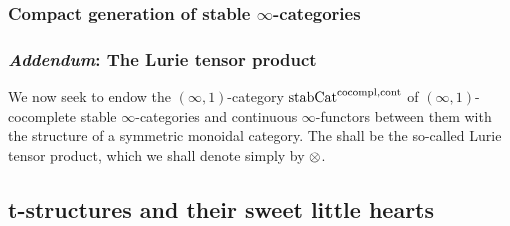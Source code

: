             \subsubsection{Compact generation of stable \texorpdfstring{$\infty$}{}-categories}
                    
            \subsubsection{\textit{Addendum}: The Lurie tensor product}
                We now seek to endow the $(\infty, 1)$-category $\mathrm{stab}\mathrm{Cat}^{\mathrm{co}\mathrm{compl}, \mathrm{cont}}$ of $(\infty, 1)$-cocomplete stable $\infty$-categories and continuous $\infty$-functors between them with the structure of a symmetric monoidal category. The  shall be the so-called Lurie tensor product, which we shall denote simply by $\tensor$. 
                
                
    
        \subsection{t-structures and their sweet little hearts}
